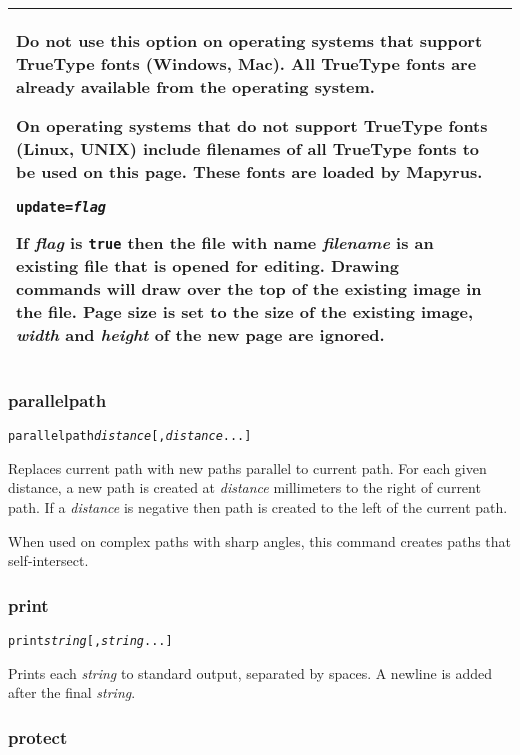 \begin{longtable}{|p{4cm}|p{10cm}|}
Do not use this option on operating systems that support
TrueType fonts (Windows, Mac).  All TrueType
fonts are already available from the operating system.

On operating systems that do not support TrueType fonts
(Linux, UNIX) include filenames of all TrueType
fonts to be used on this page.  These fonts are loaded
by Mapyrus.

\vspace{10pt}
\texttt{update=\textit{flag}}

If \textit{flag} is \texttt{true} then the file with name
\textit{filename} is an existing file that is opened for editing.
Drawing commands will draw over the top of the existing image
in the file.
Page size is set to the size of the existing image,
\textit{width} and \textit{height} of the new page are ignored.  \\

\hline

\end{longtable}

\subsubsection{parallelpath}

\begin{alltt}
parallelpath \textit{distance} [, \textit{distance} ...]
\end{alltt}

Replaces current path with new paths parallel to current path.
For each given distance, a new path is created at \textit{distance}
millimeters to the right of current path.  If a \textit{distance} is
negative then path is created to the left of the current path.

When used on complex paths with sharp angles, this command creates
paths that self-intersect.

\subsubsection{print}

\begin{alltt}
print \textit{string} [, \textit{string} ...]
\end{alltt}

Prints each \textit{string} to standard output,
separated by spaces.
A newline is added after the final \textit{string}.

\subsubsection{protect}

